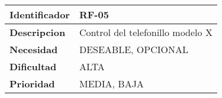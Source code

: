 \begin{center}
    \begin{tabular}{|p{2.6cm}|p{12cm}|}
    \hline
    \textbf{Identificador} & RF-05\\
    \hline
    \textbf{Descripcion} & Control del telefonillo modelo X\\
    \hline
    \textbf{Necesidad} & DESEABLE, OPCIONAL\\
    \hline
    \textbf{Dificultad} & ALTA\\
    \hline
    \textbf{Prioridad} & MEDIA, BAJA\\
    \hline
    \end{tabular}
\end{center}
